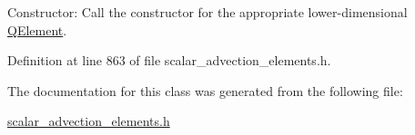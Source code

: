Constructor\+: Call the constructor for the appropriate lower-\/dimensional \hyperlink{classoomph_1_1QElement}{Q\+Element}. 



Definition at line 863 of file scalar\+\_\+advection\+\_\+elements.\+h.



The documentation for this class was generated from the following file\+:\begin{DoxyCompactItemize}
\item 
\hyperlink{scalar__advection__elements_8h}{scalar\+\_\+advection\+\_\+elements.\+h}\end{DoxyCompactItemize}
